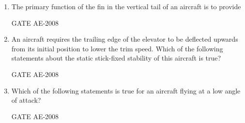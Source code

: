\documentclass[journal,12pt,onecolumn]{IEEEtran}
\theoremstyle{remark}
\begin{document}
\begin{enumerate}
    \quad

\item The primary function of the fin in the vertical tail of an aircraft is to provide  \\
\begin{enumerate}
\end{enumerate}
    \hfill{GATE AE-2008}

    \quad

\item An aircraft requires the trailing edge of the elevator to be deflected upwards from its initial position to lower the trim speed. Which of the following statements about the static stick-fixed stability of this aircraft is true? \\ 
\begin{enumerate}
\end{enumerate}
    \hfill{GATE AE-2008}

    \quad

\item Which of the following statements is true for an aircraft flying at a low angle of attack?  \\
\begin{enumerate}
\end{enumerate}
    \hfill{GATE AE-2008}


\end{enumerate}
\end{document}
